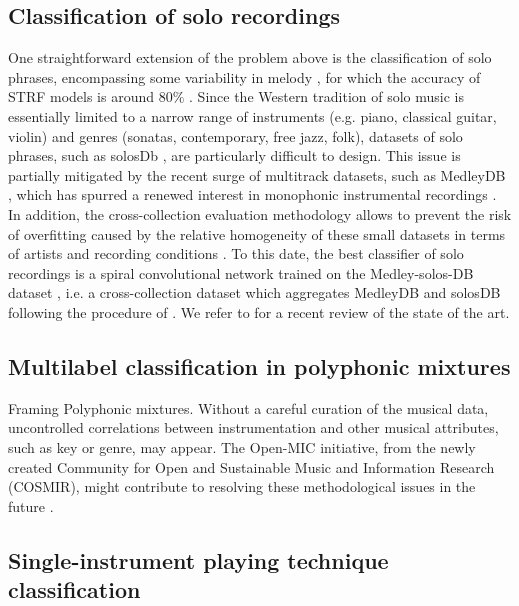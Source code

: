 \documentclass{article}
\makeatletter
\newcommand*{\eg}{e.g.\@\xspace}
\newcommand*{\ie}{i.e.\@\xspace}
\makeatother
\begin{document}
\subsection{Classification of solo recordings}
One straightforward extension of the problem above is the classification of solo phrases, encompassing some variability in melody \cite{krishna2004icassp}, for which the accuracy of STRF models is around $80\%$ \cite{patil2015eurasip}.
Since the Western tradition of solo music is essentially limited to a narrow range of instruments (\eg{} piano, classical guitar, violin) and genres (sonatas, contemporary, free jazz, folk), datasets of solo phrases, such as solosDb \cite{joder2009taslp}, are particularly difficult to design.
This issue is partially mitigated by the recent surge of multitrack datasets, such as MedleyDB \cite{bittner2014ismir}, which has spurred a renewed interest in monophonic instrumental recordings \cite{yip2017ismir}.
In addition, the cross-collection evaluation methodology \cite{livshin2003ismir} allows to prevent the risk of overfitting caused by the relative homogeneity of these small datasets in terms of artists and recording conditions \cite{bogdanov2016ismir}.
To this date, the best classifier of solo recordings is a spiral convolutional network \cite{lostanlen2016ismir} trained on the Medley-solos-DB dataset \cite{lostanlen2018msdb}, \ie{} a cross-collection dataset which aggregates MedleyDB and solosDB following the procedure of \cite{donnelly2015icdmw}.
We refer to \cite{han2017taslp} for a recent review of the state of the art.

\subsection{Multilabel classification in polyphonic mixtures}
Framing 
Polyphonic mixtures.
\cite{martins2007ismir}
\cite{burred2009icassp}
\cite{fuhrmann2010dafx}
Without a careful curation of the musical data, uncontrolled correlations between instrumentation and other musical attributes, such as key or genre, may appear.
The Open-MIC initiative, from the newly created Community for Open and Sustainable Music and Information Research (COSMIR), might contribute to resolving these methodological issues in the future \cite{mcfee2016ismir}.

\subsection{Single-instrument playing technique classification}
\end{document}
